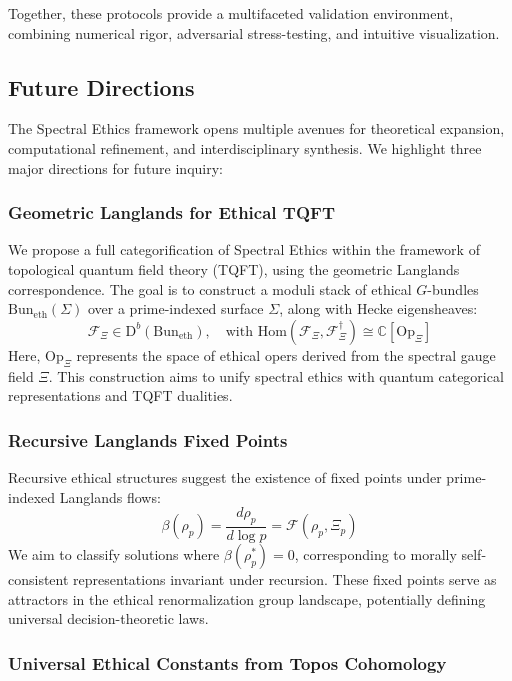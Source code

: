 \documentclass{article}
\theoremstyle{plain}
\theoremstyle{claimstyle}
\begin{document}
Together, these protocols provide a multifaceted validation environment, combining numerical rigor, adversarial stress-testing, and intuitive visualization.

\subsection{Future Directions}

The Spectral Ethics framework opens multiple avenues for theoretical expansion, computational refinement, and interdisciplinary synthesis. We highlight three major directions for future inquiry:

\subsubsection{Geometric Langlands for Ethical TQFT}

We propose a full categorification of Spectral Ethics within the framework of topological quantum field theory (TQFT), using the geometric Langlands correspondence. The goal is to construct a moduli stack of ethical $G$-bundles $\mathrm{Bun}_{\mathrm{eth}}(\Sigma)$ over a prime-indexed surface $\Sigma$, along with Hecke eigensheaves:
\[
\mathcal{F}_\Xi \in \mathrm{D}^b(\mathrm{Bun}_{\mathrm{eth}}), \quad \text{with } \mathrm{Hom}(\mathcal{F}_\Xi, \mathcal{F}_\Xi^\dagger) \cong \mathbb{C}[\mathrm{Op}_\Xi]
\]
Here, $\mathrm{Op}_\Xi$ represents the space of ethical opers derived from the spectral gauge field $\Xi$. This construction aims to unify spectral ethics with quantum categorical representations and TQFT dualities.

\subsubsection{Recursive Langlands Fixed Points}

Recursive ethical structures suggest the existence of fixed points under prime-indexed Langlands flows:
\[
\beta(\rho_p) = \frac{d\rho_p}{d \log p} = \mathcal{F}(\rho_p, \Xi_p)
\]
We aim to classify solutions where $\beta(\rho_p^*) = 0$, corresponding to morally self-consistent representations invariant under recursion. These fixed points serve as attractors in the ethical renormalization group landscape, potentially defining universal decision-theoretic laws.

\subsubsection{Universal Ethical Constants from Topos Cohomology}
\end{document}
